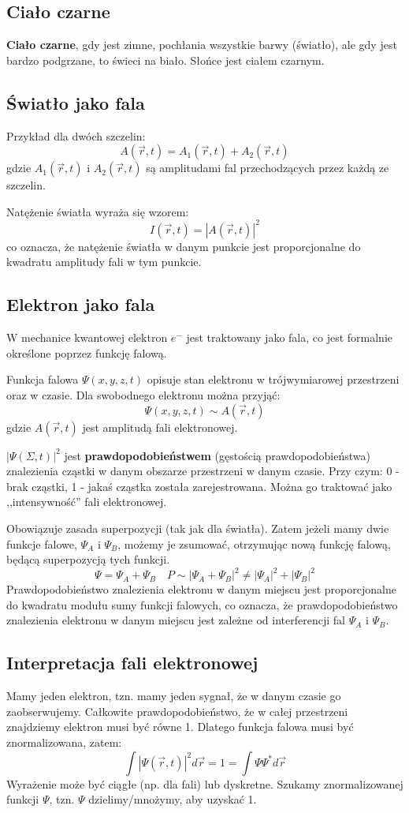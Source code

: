 \subsection{Ciało czarne}

\textbf{Ciało czarne}, gdy jest zimne, pochłania wszystkie barwy (światło), ale gdy jest bardzo podgrzane, to świeci na biało.
Słońce jest ciałem czarnym.

\subsection{Światło jako fala}
Przykład dla dwóch szczelin:
\[
A(\vec{r}, t) = A_1(\vec{r}, t) + A_2(\vec{r}, t)
\]
gdzie $A_1(\vec{r}, t)$ i $A_2(\vec{r}, t)$ są amplitudami fal przechodzących przez każdą ze szczelin.

Natężenie światła wyraża się wzorem:
\[
I(\vec{r}, t) = |A(\vec{r}, t)|^2
\]
co oznacza, że natężenie światła w danym punkcie jest proporcjonalne do kwadratu amplitudy fali w tym punkcie.

\subsection{Elektron jako fala}
W mechanice kwantowej elektron $e^-$ jest traktowany jako fala, co jest formalnie określone poprzez funkcję falową. 

Funkcja falowa $\Psi(x,y,z,t)$ opisuje stan elektronu w trójwymiarowej przestrzeni oraz w czasie. Dla swobodnego elektronu można przyjąć:
\[
\Psi(x,y,z,t) \sim A(\vec{r}, t)
\]
gdzie $A(\vec{r},t)$ jest amplitudą fali elektronowej.

$|\Psi(\Sigma, t)|^2$ jest \textbf{prawdopodobieństwem} (gęstością prawdopodobieństwa) znalezienia cząstki w danym obszarze przestrzeni w danym czasie.
Przy czym: 0 - brak cząstki, 1 - jakaś cząstka została zarejestrowana. Można go traktować jako ,,intensywność'' fali elektronowej.

Obowiązuje zasada superpozycji (tak jak dla światła).
Zatem jeżeli mamy dwie funkcje falowe, $\Psi_A$ i $\Psi_B$, możemy je zsumować, otrzymując nową funkcję falową, będącą superpozycją tych funkcji.
\[
\Psi = \Psi_A + \Psi_B \quad P \sim |\Psi_A + \Psi_B|^2 \neq |\Psi_A|^2 + |\Psi_B|^2
\]
Prawdopodobieństwo znalezienia elektronu w danym miejscu jest proporcjonalne do kwadratu modułu sumy funkcji falowych,
co oznacza, że prawdopodobieństwo znalezienia elektronu w danym miejscu jest zależne od interferencji fal $\Psi_A$ i $\Psi_B$.

\subsection{Interpretacja fali elektronowej}
Mamy jeden elektron, tzn. mamy jeden sygnał, że w danym czasie go zaobserwujemy.
Całkowite prawdopodobieństwo, że w całej przestrzeni znajdziemy elektron musi być równe 1.
Dlatego funkcja falowa musi być znormalizowana, zatem:
\[
\int |\Psi(\vec{r}, t)|^2 d\vec{r} = 1 = \int \Psi \Psi^* d\vec{r}
\]
Wyrażenie może być ciągłe (np. dla fali) lub dyskretne.
Szukamy znormalizowanej funkcji $\Psi$, tzn. $\Psi$ dzielimy/mnożymy, aby uzyskać 1.

